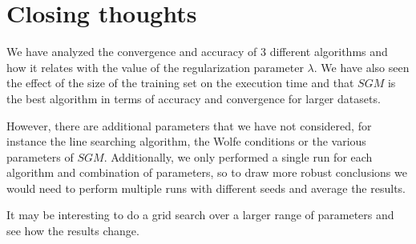 




\tableofcontents \pagebreak




\setlength{\parskip}{1em plus 0.5em minus 0.2em}

\setlength{\headheight}{14.5pt}
\pagestyle{fancy}




\null
\vspace{6em}
\section{Closing thoughts}%
\label{sec:final-remarks}

We have analyzed the convergence and accuracy of 3 different algorithms and how
it relates with the value of the regularization parameter $\lambda$. We have also
seen the effect of the size of the training set on the execution time and that
$SGM$ is the best algorithm in terms of accuracy and convergence for larger datasets.

However, there are additional parameters that we have not considered, for instance
the line searching algorithm, the Wolfe conditions or the various parameters of
$SGM$. Additionally, we only performed a single run for each algorithm and combination
of parameters, so to draw more robust conclusions we would need to perform multiple
runs with different seeds and average the results.

It may be interesting to do a grid search over a larger range of parameters and
see how the results change.

